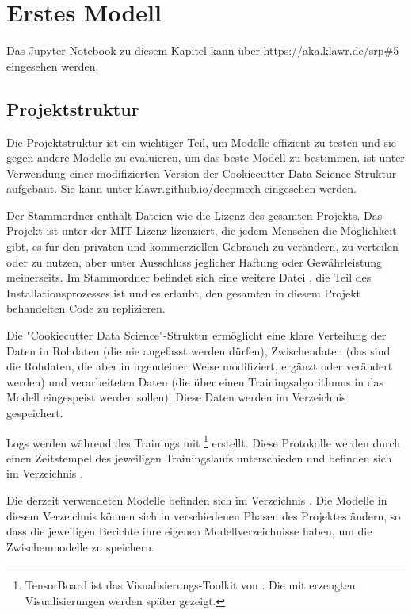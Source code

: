 \section{Erstes Modell}

Das Jupyter-Notebook zu diesem Kapitel kann über \url{https://aka.klawr.de/srp\#5} eingesehen werden.

\subsection{Projektstruktur}

Die Projektstruktur ist ein wichtiger Teil, um Modelle effizient zu testen und sie gegen andere Modelle zu evaluieren, um das beste Modell zu bestimmen.
 ist unter Verwendung einer modifizierten Version der Cookiecutter Data Science \cite{drivendata2019} Struktur aufgebaut. Sie kann unter \url{klawr.github.io/deepmech} eingesehen werden.

Der Stammordner enthält Dateien wie die Lizenz des gesamten Projekts.
Das Projekt ist unter der MIT-Lizenz lizenziert, die jedem Menschen die Möglichkeit gibt, es für den privaten und kommerziellen Gebrauch zu verändern, zu verteilen oder zu nutzen, aber unter Ausschluss jeglicher Haftung oder Gewährleistung meinerseits.
Im Stammordner befindet sich eine weitere Datei , die Teil des Installationsprozesses ist und es erlaubt, den gesamten in diesem Projekt behandelten Code zu replizieren.

Die "Cookiecutter Data Science"-Struktur ermöglicht eine klare Verteilung der Daten in Rohdaten (die nie angefasst werden dürfen), Zwischendaten (das sind die Rohdaten, die aber in irgendeiner Weise modifiziert, ergänzt oder verändert werden) und verarbeiteten Daten (die über einen Trainingsalgorithmus in das Modell eingespeist werden sollen).
Diese Daten werden im Verzeichnis  gespeichert.

Logs werden während des Trainings mit \footnote{TensorBoard ist das Visualisierungs-Toolkit von . Die mit  erzeugten Visualisierungen werden später gezeigt.} erstellt.
Diese Protokolle werden durch einen Zeitstempel des jeweiligen Trainingslaufs unterschieden und befinden sich im Verzeichnis .

Die derzeit verwendeten Modelle befinden sich im Verzeichnis .
Die Modelle in diesem Verzeichnis können sich in verschiedenen Phasen des Projektes ändern, so dass die jeweiligen Berichte ihre eigenen Modellverzeichnisse haben, um die Zwischenmodelle zu speichern.

